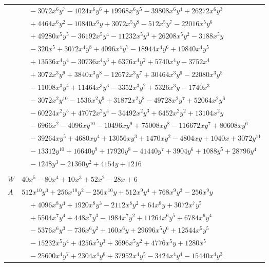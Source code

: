 \documentclass[11pt]{article}
\begin{document}
\begin{longtable}{@{}ll@{}}
 & $\quad -3072x^{6}y^{7}-1024x^{6}y^{6}+19968x^{6}y^{5}-39808x^{6}y^{4}+26272x^{6}y^{3}$\\
 & $\quad +4464x^{6}y^{2}-10840x^{6}y+3072x^{5}y^{8}-512x^{5}y^{7}-22016x^{5}y^{6}$\\
 & $\quad +49280x^{5}y^{5}-36192x^{5}y^{4}-11232x^{5}y^{3}+26208x^{5}y^{2}-3188x^{5}y$\\
 & $\quad -320x^{5}+3072x^{4}y^{8}+4096x^{4}y^{7}-18944x^{4}y^{6}+19840x^{4}y^{5}$\\
 & $\quad +13536x^{4}y^{4}-30736x^{4}y^{3}+6376x^{4}y^{2}+5740x^{4}y-3752x^{4}$\\
 & $\quad +3072x^{3}y^{9}+3840x^{3}y^{8}-12672x^{3}y^{7}+30464x^{3}y^{6}-22080x^{3}y^{5}$\\
 & $\quad -11008x^{3}y^{4}+11464x^{3}y^{3}-3352x^{3}y^{2}+5326x^{3}y-1740x^{3}$\\
 & $\quad -3072x^{2}y^{10}-1536x^{2}y^{9}+31872x^{2}y^{8}-49728x^{2}y^{7}+52064x^{2}y^{6}$\\
 & $\quad -60224x^{2}y^{5}+47072x^{2}y^{4}-34492x^{2}y^{3}+6452x^{2}y^{2}+13104x^{2}y$\\
 & $\quad -6966x^{2}-4096xy^{10}-10496xy^{9}+75008xy^{8}-116672xy^{7}+80608xy^{6}$\\
 & $\quad -39264xy^{5}+4680xy^{4}+13056xy^{3}+1470xy^{2}-4804xy+1040x+3072y^{11}$\\
 & $\quad -13312y^{10}+16640y^{9}+17920y^{8}-41440y^{7}+3904y^{6}+1088y^{5}+28796y^{4}$\\
 & $\quad -1248y^{3}-21360y^{2}+4154y+1216$\\
\addlinespace[3pt]
\multicolumn{2}{@{}l}{$i=26$, $m=2$, neighbours $0,1,5,12,15,18,21,31,33,34,36$}\\
$W$ & $40x^{5}-80x^{4}+10x^{3}+52x^{2}-28x+6$\\
$A$ & $512x^{10}y^{3}+256x^{10}y^{2}-256x^{10}y+512x^{9}y^{4}+768x^{9}y^{3}-256x^{9}y$\\
 & $\quad +4096x^{8}y^{4}+1920x^{8}y^{3}-2112x^{8}y^{2}+64x^{8}y+3072x^{7}y^{5}$\\
 & $\quad +5504x^{7}y^{4}+448x^{7}y^{3}-1984x^{7}y^{2}+11264x^{6}y^{5}+6784x^{6}y^{4}$\\
 & $\quad -5376x^{6}y^{3}-736x^{6}y^{2}+160x^{6}y+29696x^{5}y^{6}+12544x^{5}y^{5}$\\
 & $\quad -15232x^{5}y^{4}+4256x^{5}y^{3}+3696x^{5}y^{2}+4776x^{5}y+1280x^{5}$\\
 & $\quad -25600x^{4}y^{7}+2304x^{4}y^{6}+37952x^{4}y^{5}-3424x^{4}y^{4}-15440x^{4}y^{3}$\\

\end{longtable}
\end{document}
